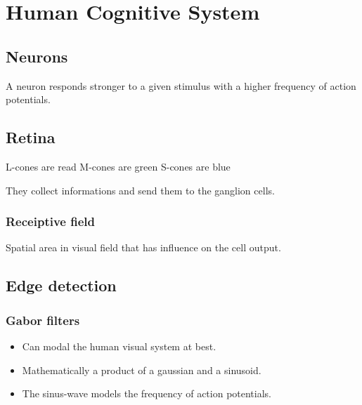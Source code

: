 \chapter{Human Cognitive System}
\section{Neurons}
A neuron responds stronger to a given stimulus with a higher frequency of action potentials.

\section{Retina}

L-cones are read
M-cones are green
S-cones are blue

They collect informations and send them to the ganglion cells.

\subsection{Receiptive field}
Spatial area in visual field that has influence on the cell output.


\section{Edge detection}

\subsection{Gabor filters}

\begin{itemize}
    \item Can modal the human visual system at best.
    \item Mathematically a product of a gaussian and a sinusoid.
    \item The sinus-wave models the frequency of action potentials.
\end{itemize}

